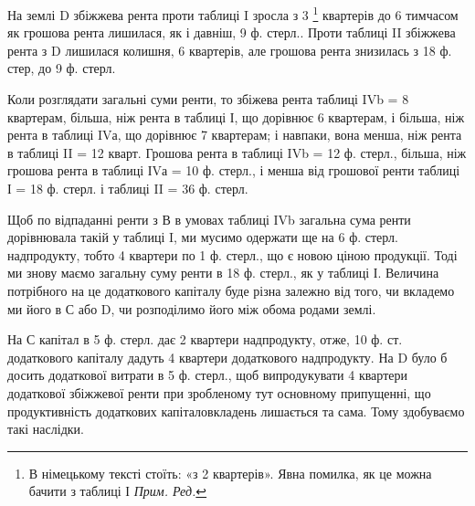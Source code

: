 На землі D збіжжева рента проти таблиці I зросла з 3 \footnote*{
В німецькому тексті стоїть: «з 2 квартерів». Явна помилка, як це можна бачити з таблиці І \emph{Прим. Ред.}
} квартерів до 6
тимчасом як грошова рента лишилася, як і давніш, 9 ф. стерл.. Проти таблиці II
збіжжева рента з D лишилася колишня, 6 квартерів, але грошова рента знизилась
з 18 ф. стер, до 9 ф. стерл.

Коли розглядати загальні суми ренти, то збіжева рента таблиці IVb = 8
квартерам, більша, ніж рента в таблиці І, що дорівнює 6 квартерам, і більша,
ніж рента в таблиці IVа, що дорівнює 7 квартерам; і навпаки, вона менша, ніж
рента в таблиці II = 12 кварт. Грошова рента в таблиці IVb = 12 ф. стерл.,
більша, ніж грошова рента в таблиці ІVа = 10 ф. стерл., і менша від грошової
ренти таблиці І = 18 ф. стерл. і таблиці II = 36 ф. стерл.

Щоб по відпаданні ренти з В в умовах таблиці IVb загальна сума ренти
дорівнювала такій у таблиці I, ми мусимо одержати ще на 6 ф. стерл.
надпродукту, тобто 4 квартери по 1 ф. стерл., що є новою ціною продукції.
Тоді ми знову маємо загальну суму ренти в 18 ф. стерл., як у таблиці І. Величина
потрібного на це додаткового капіталу буде різна залежно від того, чи
вкладемо ми його в С або D, чи розподілимо його між обома родами землі.

На С капітал в 5 ф. стерл. дає 2 квартери надпродукту, отже, 10 ф. ст.
додаткового капіталу дадуть 4 квартери додаткового надпродукту. На D було б
досить додаткової витрати в 5 ф. стерл., щоб випродукувати 4 квартери додаткової
збіжжевої ренти при зробленому тут основному припущенні, що продуктивність
додаткових капіталовкладень лишається та сама. Тому здобуваємо
такі наслідки.

